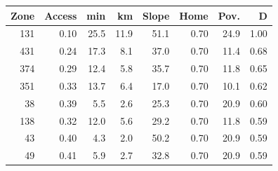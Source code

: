 \begin{tabular}{@{}rrrrrrrr@{}}
\toprule
Zone & Access & min & km & Slope & Home & Pov. & D \\
\midrule
131 & 0.10 & 25.5 & 11.9 & 51.1 & 0.70 & 24.9 & 1.00 \\
431 & 0.24 & 17.3 & 8.1 & 37.0 & 0.70 & 11.4 & 0.68 \\
374 & 0.29 & 12.4 & 5.8 & 35.7 & 0.70 & 11.8 & 0.65 \\
351 & 0.33 & 13.7 & 6.4 & 17.0 & 0.70 & 10.1 & 0.62 \\
38 & 0.39 & 5.5 & 2.6 & 25.3 & 0.70 & 20.9 & 0.60 \\
138 & 0.32 & 12.0 & 5.6 & 29.2 & 0.70 & 11.8 & 0.59 \\
43 & 0.40 & 4.3 & 2.0 & 50.2 & 0.70 & 20.9 & 0.59 \\
49 & 0.41 & 5.9 & 2.7 & 32.8 & 0.70 & 20.9 & 0.59 \\
\bottomrule
\end{tabular}
